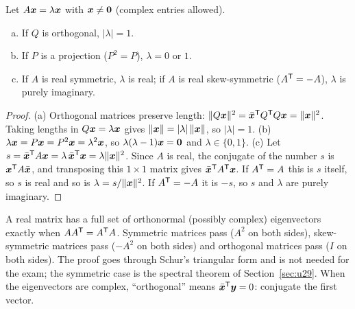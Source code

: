 \begin{proposition}\label{prop:u37-where}
Let $A\boldsymbol{x}=\lambda\boldsymbol{x}$ with $\boldsymbol{x}\neq\boldsymbol{0}$ (complex entries allowed).
\begin{enumerate}[(a)]
\item If $Q$ is orthogonal, $|\lambda|=1$.
\item If $P$ is a projection ($P^{2}=P$), $\lambda=0$ or $1$.
\item If $A$ is real symmetric, $\lambda$ is real; if $A$ is real skew-symmetric ($A^{\mathsf{T}}=-A$), $\lambda$ is purely imaginary.
\end{enumerate}
\end{proposition}
\begin{proof}
(a) Orthogonal matrices preserve length: $\|Q\boldsymbol{x}\|^{2}=\bar{\boldsymbol{x}}^{\mathsf{T}} Q^{\mathsf{T}} Q\boldsymbol{x}=\|\boldsymbol{x}\|^{2}$. Taking lengths in $Q\boldsymbol{x}=\lambda\boldsymbol{x}$ gives $\|\boldsymbol{x}\|=|\lambda|\,\|\boldsymbol{x}\|$, so $|\lambda|=1$.
(b) $\lambda\boldsymbol{x}=P\boldsymbol{x}=P^{2}\boldsymbol{x}=\lambda^{2}\boldsymbol{x}$, so $\lambda(\lambda-1)\boldsymbol{x}=\boldsymbol{0}$ and $\lambda\in\{0,1\}$.
(c) Let $s=\bar{\boldsymbol{x}}^{\mathsf{T}} A\boldsymbol{x}=\lambda\,\bar{\boldsymbol{x}}^{\mathsf{T}}\boldsymbol{x}=\lambda\|\boldsymbol{x}\|^{2}$. Since $A$ is real, the conjugate of the number $s$ is $\boldsymbol{x}^{\mathsf{T}} A\bar{\boldsymbol{x}}$, and transposing this $1\times1$ matrix gives $\bar{\boldsymbol{x}}^{\mathsf{T}} A^{\mathsf{T}}\boldsymbol{x}$. If $A^{\mathsf{T}}=A$ this is $s$ itself, so $s$ is real and so is $\lambda=s/\|\boldsymbol{x}\|^{2}$. If $A^{\mathsf{T}}=-A$ it is $-s$, so $s$ and $\lambda$ are purely imaginary.
\end{proof}

\begin{remark}\label{rem:u37-normal}
A real matrix has a full set of orthonormal (possibly complex) eigenvectors exactly when $AA^{\mathsf{T}}=A^{\mathsf{T}} A$. Symmetric matrices pass ($A^{2}$ on both sides), skew-symmetric matrices pass ($-A^{2}$ on both sides) and orthogonal matrices pass ($I$ on both sides). The proof goes through Schur's triangular form and is not needed for the exam; the symmetric case is the spectral theorem of Section~\ref{sec:u29}. When the eigenvectors are complex, ``orthogonal'' means $\bar{\boldsymbol{x}}^{\mathsf{T}}\boldsymbol{y}=0$: conjugate the first vector.
\end{remark}

